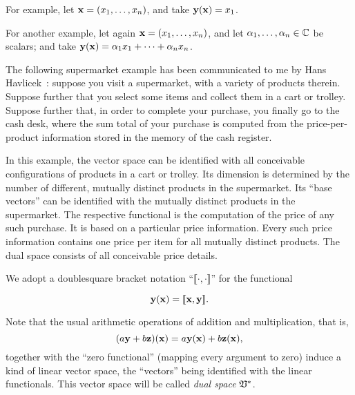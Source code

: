 {\color{blue}
\bexample
For example,
let ${\bf x} = (x_1,\ldots , x_n)$, and
take
${\bf y} ({\bf x}) =x_1$.

For another example,
let again ${\bf x} = (x_1,\ldots , x_n)$, and
let $\alpha_1,\ldots , \alpha_n \in {\Bbb C}$ be scalars; and
take
${\bf y} ({\bf x}) =\alpha_1 x_1 + \cdots +\alpha_n x_n$.

The following supermarket example has been
communicated to me by Hans Havlicek~\cite{havlicek-priv3}:
suppose you visit a supermarket, with a variety of products therein.
Suppose further that you select some items and collect them in a cart or trolley.
Suppose further that, in order to complete your purchase, you finally go to the cash desk,
where the sum total of your purchase is computed from the price-per-product information stored
in the memory of the cash register.

In this example, the vector space can be identified with all conceivable configurations of products in a cart or trolley.
Its dimension is determined by the number of different, mutually distinct products in the supermarket.
Its ``base vectors'' can be identified with the mutually distinct products in the supermarket.
The respective functional is the computation of the price of any such purchase.
It is based on a particular price information.
Every such price information contains one price per item for all mutually distinct products.
The dual space consists of all conceivable price details.
\eexample
}


We adopt a doublesquare bracket notation ``$\llbracket \cdot , \cdot \rrbracket$''
for the functional


\begin{equation}
{\bf y} ({\bf x})
=
\llbracket {\bf x},{\bf y}\rrbracket .
\end{equation}

Note that the usual arithmetic operations of addition and multiplication,
that is,
\begin{equation}
(a {\bf y} + b {\bf z}) ({\bf x})
=
a {\bf y} ({\bf x}) + b {\bf z} ({\bf x}) ,
\end{equation}
together with the ``zero functional''
(mapping every argument to zero)
induce a kind of linear vector space, the ``vectors''
being identified with the linear functionals.
This vector space will be called {\em dual space} ${\frak V}^\ast $.


